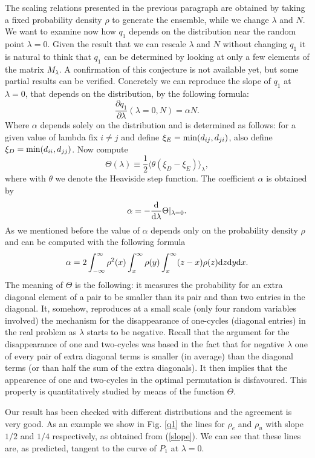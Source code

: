 \documentclass[]{iopart}
\begin{document}
The scaling relations presented in the previous paragraph are obtained  
by taking a fixed probability density $\rho$
to generate the ensemble, while we change 
$\lambda$ and $N$. We want to examine now how
$q_1$ depends on the distribution near
the random point $\lambda=0$. Given the result that we can 
rescale $\lambda$ and $N$ without changing $q_1$
it is natural to think that $q_1$ can be determined by 
looking at only a few elements of the matrix $M_{\lambda}$.
A confirmation of this conjecture is not available yet, but
some partial results can be verified. Concretely
we can reproduce the slope of $q_1$ at $\lambda=0$,
that depends on the distribution,
by the following formula:  
$$\frac{\partial q_1}{\partial\lambda}(\lambda=0,N)=\alpha N.$$
Where $\alpha$ depends solely on the distribution and is 
determined as follows:\hfill\break
for a given value of lambda fix $i\not=j$ 
and define $\xi_E={\rm min}(d_{{i}{j}},d_{{j}{i}})$, 
also define $\xi_D={\rm min}(d_{{i}{i}},d_{{j}{j}})$. Now 
compute 
$$\Theta(\lambda)\equiv\frac12\langle\theta(\xi_D-\xi_E)\rangle_\lambda,$$
where with $\theta$ we denote the Heaviside step function. The
coefficient $\alpha$ is obtained by
$$\alpha=-\frac{\rm d}{{\rm d}\lambda}\Theta\vert_{\lambda=0}.$$ 
As we mentioned before the value of $\alpha$ depends only on the 
probability density $\rho$ and can be computed with the following formula
\begin{eqnarray}\label{slope}
\alpha=2\int_{-\infty}^\infty \rho^2(x)\int_x^\infty\rho(y)
\int_x^\infty(z-x)\rho(z){\rm d}z {\rm d}y {\rm d}x.
\end{eqnarray}
The meaning of $\Theta$ is the following: it measures the probability
for an extra diagonal element of a pair to be  smaller than its pair
and than two entries in the diagonal.  
It, somehow, reproduces at a small scale (only four random variables 
involved) the mechanism for the disappearance of one-cycles 
(diagonal entries) in the real problem as $\lambda$ starts to be 
negative. 
Recall that the argument for the disappearance of one and two-cycles
was based in the fact that for negative $\lambda$
one of every pair of extra diagonal terms is smaller
(in average) than the diagonal terms
(or than half the sum of the extra diagonals).
It then implies that the appearence of one and two-cycles 
in the optimal permutation is disfavoured. This property is 
quantitatively studied by means of the function $\Theta$.

Our result has been checked with different distributions and
the agreement is very good. As an example we show in Fig. \ref{q1} 
the lines for $\rho_e$ and $\rho_u$ with slope
$1/2$ and $1/4$ respectively, as obtained from (\ref{slope}). 
We can see that these lines are, as predicted,
tangent to the curve of $P_1$ at $\lambda=0$.
\end{document}
